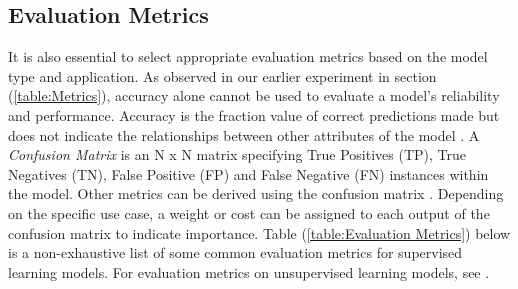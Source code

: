 \subsection{Evaluation Metrics}
It is also essential to select appropriate evaluation metrics based on the model type and application.
As observed in our earlier experiment in section (\ref{table:Metrics}), accuracy alone cannot be used to evaluate a model's reliability and performance.
Accuracy is the fraction value of correct predictions made but does not indicate the relationships between other attributes of the model \cite{8320256}.
A \textit{Confusion Matrix} is an N x N matrix specifying True Positives (TP), True Negatives (TN), False Positive (FP) and False Negative (FN) instances within the model.
Other metrics can be derived using the confusion matrix \cite{8320256}.
Depending on the specific use case, a weight or cost can be assigned to each output of the confusion matrix to indicate importance.
Table (\ref{table:Evaluation Metrics}) below is a non-exhaustive list of some common evaluation metrics for supervised learning models.
For evaluation metrics on unsupervised learning models, see \cite{palacioniño2019evaluation}.

